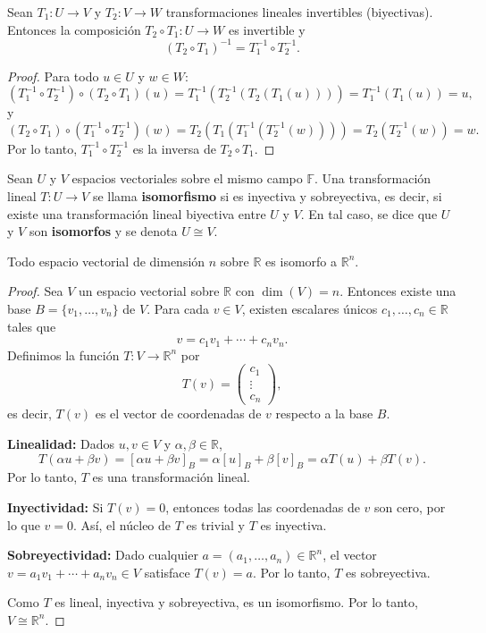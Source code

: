 \begin{theorem}
Sean $T_1: U \to V$ y $T_2: V \to W$ transformaciones lineales invertibles (biyectivas). Entonces la composición $T_2 \circ T_1: U \to W$ es invertible y
\[
(T_2 \circ T_1)^{-1} = T_1^{-1} \circ T_2^{-1}.
\]
\begin{proof}
Para todo $u \in U$ y $w \in W$:
\[
(T_1^{-1} \circ T_2^{-1}) \circ (T_2 \circ T_1)(u) = T_1^{-1}(T_2^{-1}(T_2(T_1(u)))) = T_1^{-1}(T_1(u)) = u,
\]
y
\[
(T_2 \circ T_1) \circ (T_1^{-1} \circ T_2^{-1})(w) = T_2(T_1(T_1^{-1}(T_2^{-1}(w)))) = T_2(T_2^{-1}(w)) = w.
\]
Por lo tanto, $T_1^{-1} \circ T_2^{-1}$ es la inversa de $T_2 \circ T_1$.
\end{proof}
\end{theorem}


\begin{definition}[Isomorfismo]
Sean $U$ y $V$ espacios vectoriales sobre el mismo campo $\mathbb{F}$. Una transformación lineal $T: U \to V$ se llama \textbf{isomorfismo} si es inyectiva y sobreyectiva, es decir, si existe una transformación lineal biyectiva entre $U$ y $V$. En tal caso, se dice que $U$ y $V$ son \textbf{isomorfos} y se denota $U \cong V$.
\end{definition}

\begin{theorem}
Todo espacio vectorial de dimensión $n$ sobre $\mathbb{R}$ es isomorfo a $\mathbb{R}^n$.
\begin{proof}
Sea $V$ un espacio vectorial sobre $\mathbb{R}$ con $\dim(V) = n$. Entonces existe una base $B = \{v_1, \ldots, v_n\}$ de $V$. Para cada $v \in V$, existen escalares únicos $c_1, \ldots, c_n \in \mathbb{R}$ tales que
\[
v = c_1 v_1 + \cdots + c_n v_n.
\]
Definimos la función $T: V \to \mathbb{R}^n$ por
\[
T(v) = \begin{pmatrix} c_1 \\ \vdots \\ c_n \end{pmatrix},
\]
es decir, $T(v)$ es el vector de coordenadas de $v$ respecto a la base $B.$

\textbf{Linealidad:} Dados $u, v \in V$ y $\alpha, \beta \in \mathbb{R}$,
\[
T(\alpha u + \beta v) = [\alpha u + \beta v]_B = \alpha [u]_B + \beta [v]_B = \alpha T(u) + \beta T(v).
\]
Por lo tanto, $T$ es una transformación lineal.

\textbf{Inyectividad:} Si $T(v) = 0$, entonces todas las coordenadas de $v$ son cero, por lo que $v = 0$. Así, el núcleo de $T$ es trivial y $T$ es inyectiva.

\textbf{Sobreyectividad:} Dado cualquier $a = (a_1, \ldots, a_n) \in \mathbb{R}^n$, el vector $v = a_1 v_1 + \cdots + a_n v_n \in V$ satisface $T(v) = a$. Por lo tanto, $T$ es sobreyectiva.

Como $T$ es lineal, inyectiva y sobreyectiva, es un isomorfismo. Por lo tanto, $V \cong \mathbb{R}^n.$
\end{proof}
\end{theorem}

